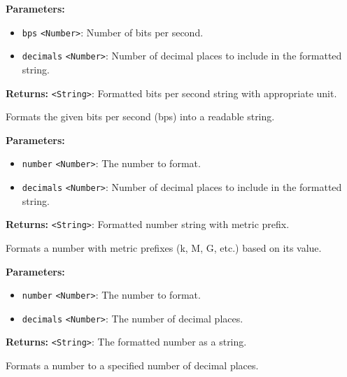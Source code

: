 \documentclass[12pt,a4paper]{article}
\begin{document}
\noindent \textbf{Parameters:}
\begin{itemize}
  \item \texttt{bps} \texttt{<Number>}: Number of bits per second.
  \item \texttt{decimals} \texttt{<Number>}: Number of decimal places to include in the formatted string.
\end{itemize}

\noindent \textbf{Returns:} \texttt{<String>}: Formatted bits per second string with appropriate unit.

\noindent Formats the given bits per second (bps) into a readable string.

\vspace{5mm}
\noindent {}


\noindent \textbf{Parameters:}
\begin{itemize}
  \item \texttt{number} \texttt{<Number>}: The number to format.
  \item \texttt{decimals} \texttt{<Number>}: Number of decimal places to include in the formatted string.
\end{itemize}

\noindent \textbf{Returns:} \texttt{<String>}: Formatted number string with metric prefix.

\noindent Formats a number with metric prefixes (k, M, G, etc.) based on its value.

\vspace{5mm}
\noindent {}


\noindent \textbf{Parameters:}
\begin{itemize}
  \item \texttt{number} \texttt{<Number>}: The number to format.
  \item \texttt{decimals} \texttt{<Number>}: The number of decimal places.
\end{itemize}

\noindent \textbf{Returns:} \texttt{<String>}: The formatted number as a string.

\noindent Formats a number to a specified number of decimal places.

\vspace{5mm}
\noindent {}
\end{document}
